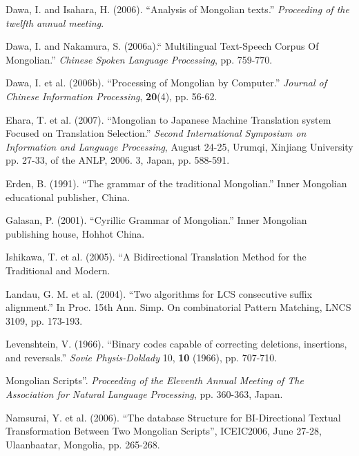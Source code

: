 \documentclass[english]{jnlp_1.4}
\begin{document}
\begin{thebibliography}{}

\item
Dawa, I. and Isahara, H. (2006). ``Analysis of Mongolian texts.'' 
\textit{Proceeding of the twelfth annual meeting}.

\item
Dawa, I. and Nakamura, S. (2006a).`` Multilingual Text-Speech Corpus Of 
Mongolian.'' \textit{Chinese Spoken Language Processing}, pp. 759-770.

\item
Dawa, I. et al. (2006b). ``Processing of Mongolian by Computer.'' \textit{Journal of Chinese Information Processing}, 
\textbf{20}(4), pp. 56-62.

\item
Ehara, T. et al. (2007). ``Mongolian to Japanese Machine Translation system 
Focused on Translation Selection.'' \textit{Second International Symposium on Information and Language Processing}, August 24-25, Urumqi, Xinjiang 
University pp. 27-33, of the ANLP, 2006. 3, Japan, pp. 588-591.

\item
Erden, B. (1991). ``The grammar of the traditional Mongolian.'' Inner 
Mongolian educational publisher, China.

\item
Galasan, P. (2001). ``Cyrillic Grammar of Mongolian.'' Inner Mongolian 
publishing house, Hohhot China.

\item
Ishikawa, T. et al. (2005). ``A Bidirectional Translation Method for the 
Traditional and Modern.

\item
Landau, G. M. et al. (2004). ``Two algorithms for LCS consecutive suffix 
alignment.'' In Proc. 15th Ann. Simp. On combinatorial Pattern Matching, 
LNCS 3109, pp. 173-193.

\item
Levenshtein, V. (1966). ``Binary codes capable of correcting deletions, 
insertions, and reversals.'' \textit{Sovie Physis-Doklady} 10, \textbf{10} (1966), pp. 707-710.

\item
Mongolian Scripts''. \textit{Proceeding of the Eleventh Annual Meeting of The Association for Natural Language Processing}, pp. 360-363, Japan.

\item
Namsurai, Y. et al. (2006). ``The database Structure for BI-Directional 
Textual Transformation Between Two Mongolian Scripts'', ICEIC2006, June 
27-28, Ulaanbaatar, Mongolia, pp. 265-268.


\end{thebibliography}
\end{document}
